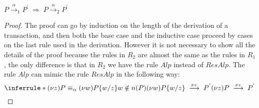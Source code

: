 \begin{theorem}
  $P\xrightarrow{\alpha}_{1}P^{'}\; \Rightarrow\; P\xrightarrow{\alpha}_{2}P^{'}$
  \begin{proof}
    The proof can go by induction on the length of the derivation of a transaction, and then both the base case and the inductive case proceed by cases on the last rule used in the derivation. However it is not necessary to show all the details of the proof because the rules in $R_{2}$ are almost the same as the rules in $R_{1}$, the only difference is that in $R_{2}$ we have the rule $Alp$ instead of $ResAlp$. The rule $Alp$ can mimic the rule $ResAlp$ in the following way:
	\[
	  \inferrule *{
	      (\nu z)P\equiv_{\alpha} (\nu w)P\{w/z\}
	    \\
	      w\notin n(P)
	    \\
	      (\nu w)P\{w/z\}\;
		\xrightarrow{xz}\;
		  P^{'}
	  }{
	    (\nu z)P\; 
	      \xrightarrow{xz}\;
		P^{'}
	  }
	\]
  \end{proof}
\end{theorem}



